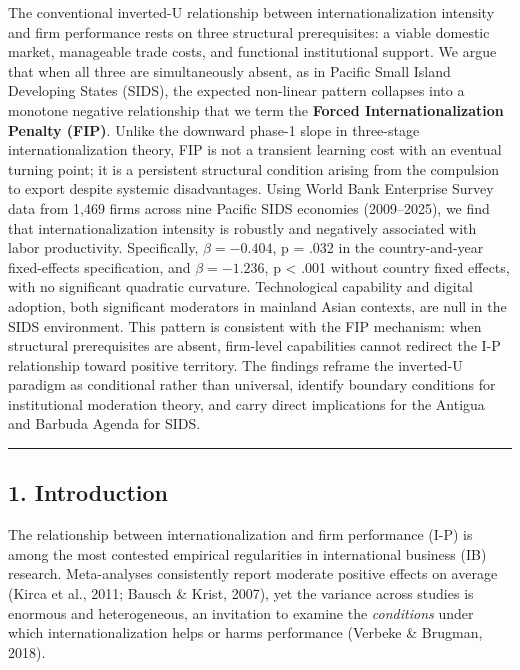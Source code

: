 \documentclass[12pt,a4paper]{article}
\begin{document}
The conventional inverted-U relationship between internationalization
intensity and firm performance rests on three structural prerequisites:
a viable domestic market, manageable trade costs, and functional
institutional support. We argue that when all three are simultaneously
absent, as in Pacific Small Island Developing States (SIDS), the
expected non-linear pattern collapses into a monotone negative
relationship that we term the \textbf{Forced Internationalization
Penalty (FIP)}. Unlike the downward phase-1 slope in three-stage
internationalization theory, FIP is not a transient learning cost with
an eventual turning point; it is a persistent structural condition
arising from the compulsion to export despite systemic disadvantages.
Using World Bank Enterprise Survey data from 1,469 firms across nine
Pacific SIDS economies (2009--2025), we find that internationalization
intensity is robustly and negatively associated with labor productivity.
Specifically, \(\beta = −0.404\), p = .032 in the country-and-year
fixed-effects specification, and \(\beta = −1.236\), p \textless{} .001
without country fixed effects, with no significant quadratic curvature.
Technological capability and digital adoption, both significant
moderators in mainland Asian contexts, are null in the SIDS environment.
This pattern is consistent with the FIP mechanism: when structural
prerequisites are absent, firm-level capabilities cannot redirect the
I-P relationship toward positive territory. The findings reframe the
inverted-U paradigm as conditional rather than universal, identify
boundary conditions for institutional moderation theory, and carry
direct implications for the Antigua and Barbuda Agenda for SIDS.

\begin{center}\rule{0.5\linewidth}{0.5pt}\end{center}

\hypertarget{1-introduction}{%
\subsection{1. Introduction}\label{1-introduction}}

The relationship between internationalization and firm performance (I-P)
is among the most contested empirical regularities in international
business (IB) research. Meta-analyses consistently report moderate
positive effects on average (Kirca et al., 2011; Bausch \& Krist, 2007),
yet the variance across studies is enormous and heterogeneous, an
invitation to examine the \emph{conditions} under which
internationalization helps or harms performance (Verbeke \& Brugman,
2018).
\end{document}
